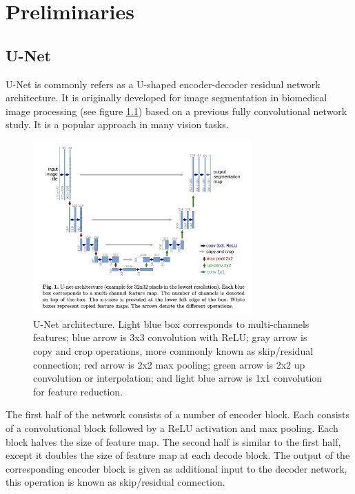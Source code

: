 \chapter{Preliminaries}
\label{chapterlabel2}

\section{U-Net}
U-Net\cite{ronnebergerUNetConvolutionalNetworks2015} is commonly refers as a U-shaped encoder-decoder residual network architecture. It is originally developed for image segmentation in biomedical image processing (see figure \ref{fig:unet_arch}) based on a previous fully convolutional network study\cite{longFullyConvolutionalNetworks2015}. It is a popular approach in many vision tasks.

\begin{figure}
    \centering
    \includegraphics[width=0.75\textwidth]{images/preliminary/unet_arch.png}
    \caption{U-Net architecture. Light blue box corresponds to multi-channels features; blue arrow is 3x3 convolution with ReLU; gray arrow is copy and crop operations, more commonly known as skip/residual connection; red arrow is 2x2 max pooling; green arrow is 2x2 up convolution or interpolation; and light blue arrow is 1x1 convolution for feature reduction.\cite{ronnebergerUNetConvolutionalNetworks2015}} 
    \label{fig:unet_arch}
\end{figure}

The first half of the network consists of a number of encoder block. Each consists of a convolutional block followed by a ReLU activation and max pooling. Each block halves the size of feature map. The second half is similar to the first half, except it doubles the size of feature map at each decode block. The output of the corresponding encoder block is given as additional input to the decoder network, this operation is known as skip/residual connection.

